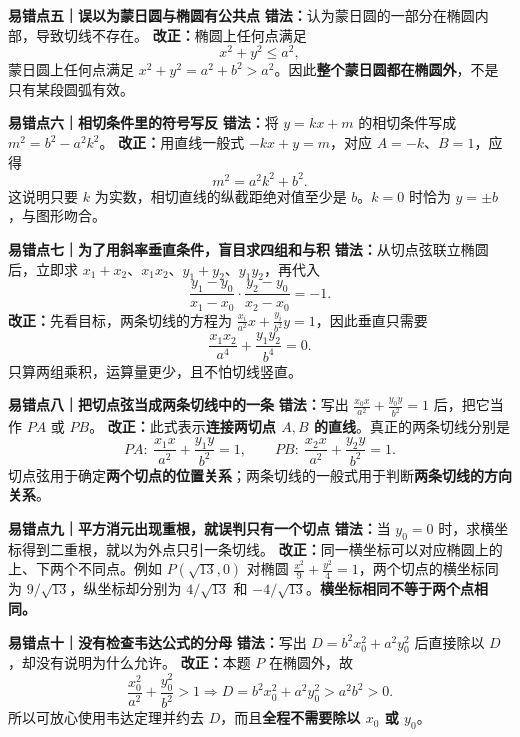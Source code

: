 \begin{trapbox}
  \medskip
  \textbf{\textcolor{CTrap}{易错点五｜误以为蒙日圆与椭圆有公共点}}
  \textbf{错法：}认为蒙日圆的一部分在椭圆内部，导致切线不存在。
  \textbf{改正：}椭圆上任何点满足
  \[
    x^2+y^2\le a^2,
  \]
  蒙日圆上任何点满足 $x^2+y^2=a^2+b^2>a^2$。因此\textbf{整个蒙日圆都在椭圆外}，不是只有某段圆弧有效。

  \medskip
  \textbf{\textcolor{CTrap}{易错点六｜相切条件里的符号写反}}
  \textbf{错法：}将 $y=kx+m$ 的相切条件写成 $m^2=b^2-a^2k^2$。
  \textbf{改正：}用直线一般式 $-kx+y=m$，对应 $A=-k$、$B=1$，应得
  \[
    \boxed{m^2=a^2k^2+b^2}.
  \]
  这说明只要 $k$ 为实数，相切直线的纵截距绝对值至少是 $b$。$k=0$ 时恰为 $y=\pm b$，与图形吻合。

  \medskip
  \textbf{\textcolor{CTrap}{易错点七｜为了用斜率垂直条件，盲目求四组和与积}}
  \textbf{错法：}从切点弦联立椭圆后，立即求 $x_1+x_2$、$x_1x_2$、$y_1+y_2$、$y_1y_2$，再代入
  \[
    \frac{y_1-y_0}{x_1-x_0}\cdot\frac{y_2-y_0}{x_2-x_0}=-1.
  \]
  \textbf{改正：}先看目标，两条切线的方程为 $\frac{x_i}{a^2}x+\frac{y_i}{b^2}y=1$，因此垂直只需要
  \[
    \boxed{\frac{x_1x_2}{a^4}+\frac{y_1y_2}{b^4}=0}.
  \]
  只算两组乘积，运算量更少，且不怕切线竖直。

  \medskip
  \textbf{\textcolor{CTrap}{易错点八｜把切点弦当成两条切线中的一条}}
  \textbf{错法：}写出 $\frac{x_0x}{a^2}+\frac{y_0y}{b^2}=1$ 后，把它当作 $PA$ 或 $PB$。
  \textbf{改正：}此式表示\textbf{连接两切点 $A,B$ 的直线}。真正的两条切线分别是
  \[
    PA:\ \frac{x_1x}{a^2}+\frac{y_1y}{b^2}=1,\qquad
    PB:\ \frac{x_2x}{a^2}+\frac{y_2y}{b^2}=1.
  \]
  切点弦用于确定\textbf{两个切点的位置关系}；两条切线的一般式用于判断\textbf{两条切线的方向关系}。

  \medskip
  \textbf{\textcolor{CTrap}{易错点九｜平方消元出现重根，就误判只有一个切点}}
  \textbf{错法：}当 $y_0=0$ 时，求横坐标得到二重根，就以为外点只引一条切线。
  \textbf{改正：}同一横坐标可以对应椭圆上的上、下两个不同点。例如 $P(\sqrt{13},0)$ 对椭圆 $\frac{x^2}{9}+\frac{y^2}{4}=1$，两个切点的横坐标同为 $9/\sqrt{13}$，纵坐标却分别为 $4/\sqrt{13}$ 和 $-4/\sqrt{13}$。\textbf{横坐标相同不等于两个点相同。}

  \medskip
  \textbf{\textcolor{CTrap}{易错点十｜没有检查韦达公式的分母}}
  \textbf{错法：}写出 $D=b^2x_0^2+a^2y_0^2$ 后直接除以 $D$，却没有说明为什么允许。
  \textbf{改正：}本题 $P$ 在椭圆外，故
  \[
    \frac{x_0^2}{a^2}+\frac{y_0^2}{b^2}>1
    \Longrightarrow D=b^2x_0^2+a^2y_0^2>a^2b^2>0.
  \]
  所以可放心使用韦达定理并约去 $D$，而且\textbf{全程不需要除以 $x_0$ 或 $y_0$}。

\end{trapbox}
